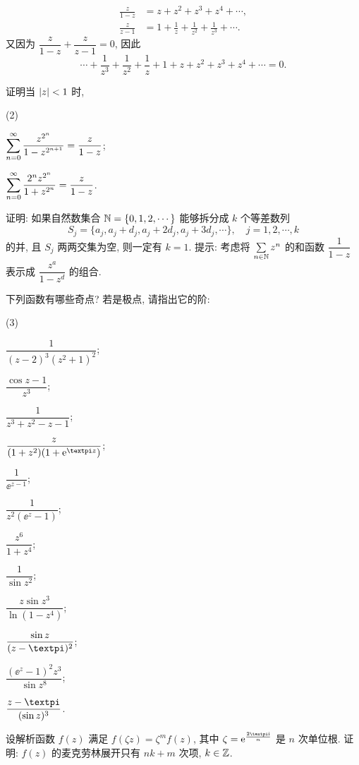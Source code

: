 \begin{homework}
\begin{homework}
      \begin{align*}
        \frac{z}{1-z}&=z+z^2+z^3+z^4+\cdots,\\
        \frac{z}{z-1}&=1+\frac1z+\frac1{z^2}+\frac1{z^3}+\cdots.
      \end{align*}
      又因为 $\dfrac{z}{1-z}+\dfrac{z}{z-1}=0$, 因此
      \[
        \cdots+\frac1{z^3}+\frac1{z^2}+\frac1z+1+z+z^2+z^3+z^4+\cdots=0.
      \]
    \item 证明当 $\lvert z\rvert<1$ 时,
    \begin{subhomework}(2)
      \item $\displaystyle\sum_{n=0}^{\infty} \frac{z^{2^n}}{1-z^{2^{n+1}}}=\frac z{1-z}$;
      \item $\displaystyle\sum_{n=0}^{\infty} \frac{2^nz^{2^n}}{1+z^{2^n}}=\frac z{1-z}$.
    \end{subhomework}
    \item 证明: 如果自然数集合 ${\mathbb{N}}=\{0,1,2,\cdots\}$ 能够拆分成 $k$ 个等差数列
    \[
      S_j=\{a_j,a_j+d_j,a_j+2d_j,a_j+3d_j,\cdots\},\quad j=1,2,\cdots,k
    \]
    的并, 且 $S_j$ 两两交集为空, 则一定有 $k=1$.
    提示: 考虑将 $\sum\limits_{n\in{\mathbb{N}}} z^n$ 的和函数 $\dfrac1{1-z}$ 表示成 $\dfrac{z^a}{1-z^d}$ 的组合.
    \item 下列函数有哪些奇点? 若是极点, 请指出它的阶:
      \begin{subhomework}(3)
        \item $\dfrac1{(z-2)^3(z^2+1)^2}$;
        \item $\dfrac{\cos z-1}{z^3}$;
        \item $\dfrac1{z^3+z^2-z-1}$;
        \item $\dfrac z{(1+z^2)(1+\ee^{\cpi z})}$;
        \item $\dfrac1{\ee^{z-1}}$;
        \item $\dfrac1{z^2(\ee^z-1)}$;
        \item $\dfrac{z^6}{1+z^4}$;
        \item $\dfrac1{\sin z^2}$;
        \item $\dfrac{z\sin z^3}{\ln(1-z^4)}$;
        \item $\dfrac{\sin z}{(z-\cpi)^2}$;
        \item $\dfrac{(\ee^z-1)^2z^3}{\sin z^8}$;
        \item $\dfrac{z-\cpi}{(\sin z)^3}$.
      \end{subhomework}
    \item 设解析函数 $f(z)$ 满足 $f(\zeta z)=\zeta^m f(z)$, 其中 $\zeta=\ee^{\frac{2\cpi\ii}n}$ 是 $n$ 次单位根.
      证明: $f(z)$ 的麦克劳林展开只有 $nk+m$ 次项, $k\in{\mathbb{Z}}$.

\end{homework}
\end{homework}
